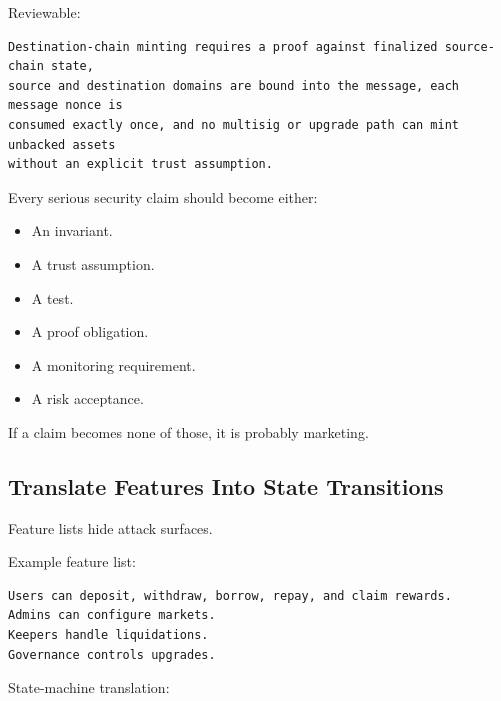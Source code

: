 Reviewable:

\begin{lstlisting}
Destination-chain minting requires a proof against finalized source-chain state,
source and destination domains are bound into the message, each message nonce is
consumed exactly once, and no multisig or upgrade path can mint unbacked assets
without an explicit trust assumption.
\end{lstlisting}

Every serious security claim should become either:

\begin{itemize}
\tightlist
\item
  An invariant.
\item
  A trust assumption.
\item
  A test.
\item
  A proof obligation.
\item
  A monitoring requirement.
\item
  A risk acceptance.
\end{itemize}

If a claim becomes none of those, it is probably marketing.

\subsection{Translate Features Into State Transitions}

Feature lists hide attack surfaces.

Example feature list:

\begin{lstlisting}
Users can deposit, withdraw, borrow, repay, and claim rewards.
Admins can configure markets.
Keepers handle liquidations.
Governance controls upgrades.
\end{lstlisting}

State-machine translation:

